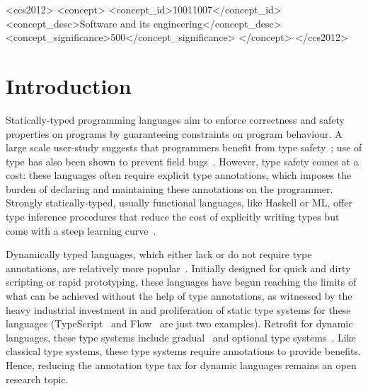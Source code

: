 \documentclass[acmsmall, review, anonymous]{acmart}\settopmatter{printfolios=true,printccs=false,printacmref=false}
\begin{document}
\begin{CCSXML}
<ccs2012>
<concept>
<concept_id>10011007</concept_id>
<concept_desc>Software and its engineering</concept_desc>
<concept_significance>500</concept_significance>
</concept>
</ccs2012>
\end{CCSXML}




\maketitle
\section{Introduction}
Statically-typed programming languages aim to enforce correctness and safety properties
on programs by guaranteeing constraints on program behaviour.
A large scale user-study
suggests that programmers
benefit from type safety~\citep{hanenberg14}; use of type has also been
shown to prevent field bugs~\citep{gao17}.
However, type safety comes at a cost: these languages often require explicit type annotations,
which imposes the burden of declaring and maintaining these annotations on the programmer.
Strongly statically-typed, usually functional languages, like Haskell or ML,
offer type inference procedures that reduce
the cost of explicitly writing types but come with
a steep learning curve~\citep{tirronen15}.

Dynamically typed languages, which either lack or do not require type
annotations, are relatively more popular~\cite{meyerovich12}.  Initially
designed for quick and dirty scripting or rapid prototyping, these languages
have begun reaching the limits of what can be achieved without the help of type
annotations, as witnessed by the heavy industrial investment in and proliferation of static type systems for these languages (TypeScript~\cite{typescript} and Flow~\cite{flow} are just two
examples).
Retrofit for dynamic languages, these type systems include gradual~\cite{siek06}
and optional type systems~\citep{bracha2004pluggable}.  Like classical type systems, these type systems
require annotations to provide benefits.  Hence, reducing the annotation type tax
for dynamic languages remains an open research topic.
\end{document}
